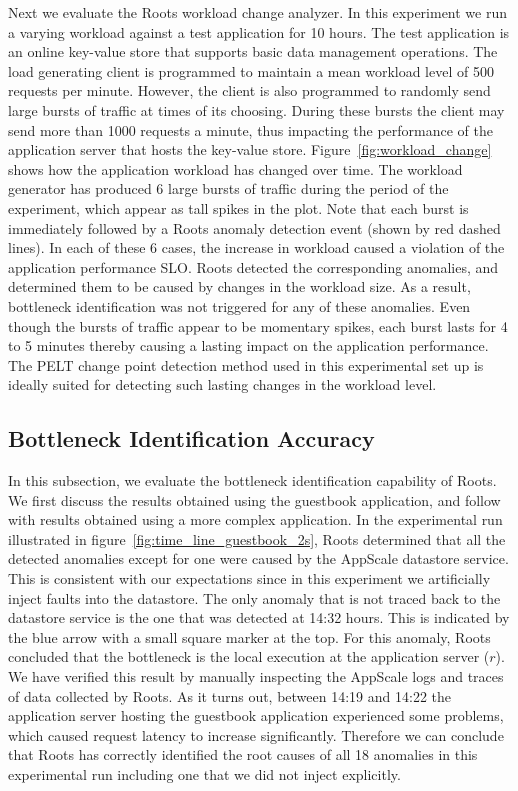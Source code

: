 Next we evaluate the Roots workload change analyzer. In this experiment we run a varying workload
against a test application for 10 hours. The test application is an online key-value store that supports
basic data management operations. The load generating client is programmed
to maintain a mean workload level of 500 requests per minute. However, the client
is also programmed to randomly send large bursts of traffic at times of its choosing. During these bursts 
the client may send more than 1000 requests a minute, thus impacting the performance of
the application server that hosts the key-value store. Figure~\ref{fig:workload_change} shows how
the application workload has changed over time. The workload generator has produced 6 large bursts of traffic during the 
period of the experiment, which appear as tall spikes in the plot.
Note that each burst is immediately followed by a Roots anomaly detection event (shown by red dashed lines). 
In each of these 6 cases, the increase in workload caused a violation of the application performance SLO.
Roots detected the corresponding anomalies, and determined them to be caused by changes in the workload size.
As a result, bottleneck identification was not triggered for any of these anomalies.
Even though the bursts of traffic appear to be momentary
spikes, each burst lasts for 4 to 5 minutes thereby causing a lasting impact on the application performance.
The PELT change point detection method used in this experimental set up is ideally suited for detecting
such lasting changes in the workload level.

\subsection{Bottleneck Identification Accuracy}

In this subsection, we evaluate the bottleneck identification capability of 
Roots. We first discuss the results obtained using
the guestbook application, and follow with
results obtained using a more complex application.
In the experimental run illustrated in 
figure~\ref{fig:time_line_guestbook_2s}, Roots determined that all the detected anomalies except for one were 
caused by the AppScale datastore service. This is consistent with our expectations since in this experiment we 
artificially inject faults into the datastore. 
The only anomaly that is not traced back to the datastore service is the one that was detected at 14:32 hours.
This is indicated by the blue arrow with a small square marker at the top. For this anomaly, Roots concluded that
the bottleneck is the local execution at the application server ($r$). We have verified
this result by manually inspecting the AppScale logs and traces of data collected by Roots. As it turns out,
between 14:19 and
14:22 the application server hosting the guestbook application experienced some problems, which caused
request latency to increase significantly. Therefore we can conclude that Roots has correctly identified 
the root causes of all 18 anomalies in this experimental run
including one that we did not inject explicitly. 

